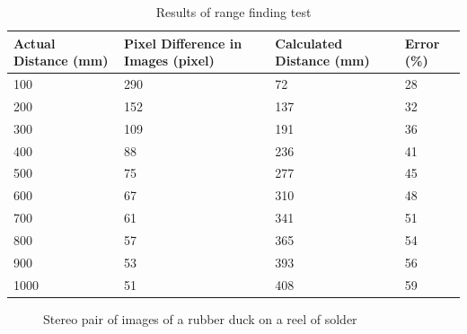 \begin{table}
\centering
\caption{Results of range finding test}
\label{table:range}
\begin{tabular}{p{3cm}p{3cm}p{3cm}p{3cm}} \toprule
\textbf{Actual Distance (mm)} & \textbf{Pixel Difference in Images (pixel)} & \textbf{Calculated Distance (mm)} & \textbf{Error (\%)} \\ \toprule
100 & 290 & 72 & 28\\ \midrule
200 & 152 & 137 & 32\\ \midrule
300 & 109 & 191 & 36\\ \midrule
400 & 88 & 236 & 41\\ \midrule
500 & 75 & 277 & 45\\ \midrule
600 & 67 & 310 & 48\\ \midrule
700 & 61 & 341 & 51\\ \midrule
800 & 57 & 365 & 54\\ \midrule
900 & 53 & 393 & 56\\ \midrule
1000 & 51 & 408 & 59\\ \bottomrule
\end{tabular}
\end{table}
\begin{figure}
\centering
{}
\caption{Stereo pair of images of a rubber duck on a reel of solder}
\label{fig:duck:stereo}
\end{figure}


